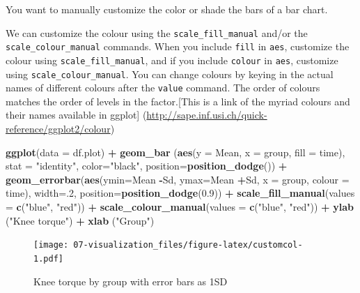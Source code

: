 \documentclass[
]{book}
\newenvironment{Shaded}{\begin{snugshade}}{\end{snugshade}}
\newcommand{\DataTypeTok}[1]{\textcolor[rgb]{0.13,0.29,0.53}{#1}}
\newcommand{\DecValTok}[1]{\textcolor[rgb]{0.00,0.00,0.81}{#1}}
\newcommand{\FloatTok}[1]{\textcolor[rgb]{0.00,0.00,0.81}{#1}}
\newcommand{\KeywordTok}[1]{\textcolor[rgb]{0.13,0.29,0.53}{\textbf{#1}}}
\newcommand{\NormalTok}[1]{#1}
\newcommand{\OperatorTok}[1]{\textcolor[rgb]{0.81,0.36,0.00}{\textbf{#1}}}
\newcommand{\StringTok}[1]{\textcolor[rgb]{0.31,0.60,0.02}{#1}}
\begin{document}
You want to manually customize the color or shade the bars of a bar chart.

We can customize the colour using the \texttt{scale\_fill\_manual} and/or the \texttt{scale\_colour\_manual} commands. When you include \texttt{fill} in \texttt{aes}, customize the colour using \texttt{scale\_fill\_manual}, and if you include \texttt{colour} in \texttt{aes}, customize using \texttt{scale\_colour\_manual}. You can change colours by keying in the actual names of different colours after the \texttt{value} command. The order of colours matches the order of levels in the factor.{[}This is a link of the myriad colours and their names available in ggplot{]} (\url{http://sape.inf.usi.ch/quick-reference/ggplot2/colour})

\begin{Shaded}
\begin{Highlighting}[]
\KeywordTok{ggplot}\NormalTok{(}\DataTypeTok{data =}\NormalTok{ df.plot) }\OperatorTok{+}\StringTok{ }
\KeywordTok{geom_bar}\NormalTok{ (}\KeywordTok{aes}\NormalTok{(}\DataTypeTok{y =}\NormalTok{ Mean, }\DataTypeTok{x =}\NormalTok{ group, }\DataTypeTok{fill =}\NormalTok{ time), }\DataTypeTok{stat =} \StringTok{"identity"}\NormalTok{, }\DataTypeTok{color=}\StringTok{"black"}\NormalTok{, }\DataTypeTok{position=}\KeywordTok{position_dodge}\NormalTok{()) }\OperatorTok{+}
\KeywordTok{geom_errorbar}\NormalTok{(}\KeywordTok{aes}\NormalTok{(}\DataTypeTok{ymin=}\NormalTok{Mean }\OperatorTok{-}\NormalTok{Sd, }\DataTypeTok{ymax=}\NormalTok{Mean }\OperatorTok{+}\NormalTok{Sd, }\DataTypeTok{x =}\NormalTok{ group, }\DataTypeTok{colour =}\NormalTok{ time), }
              \DataTypeTok{width=}\NormalTok{.}\DecValTok{2}\NormalTok{,}
               \DataTypeTok{position=}\KeywordTok{position_dodge}\NormalTok{(}\FloatTok{0.9}\NormalTok{)) }\OperatorTok{+}
\KeywordTok{scale_fill_manual}\NormalTok{(}\DataTypeTok{values =} \KeywordTok{c}\NormalTok{(}\StringTok{"blue"}\NormalTok{, }\StringTok{"red"}\NormalTok{)) }\OperatorTok{+}
\KeywordTok{scale_colour_manual}\NormalTok{(}\DataTypeTok{values =} \KeywordTok{c}\NormalTok{(}\StringTok{"blue"}\NormalTok{, }\StringTok{"red"}\NormalTok{)) }\OperatorTok{+}
\KeywordTok{ylab}\NormalTok{ (}\StringTok{"Knee torque"}\NormalTok{) }\OperatorTok{+}
\KeywordTok{xlab}\NormalTok{ (}\StringTok{"Group"}\NormalTok{)}
\end{Highlighting}
\end{Shaded}

\begin{figure}
\centering
\texttt{[image: 07-visualization\_files/figure-latex/customcol-1.pdf]}
\caption{\label{fig:customcol}Knee torque by group with error bars as 1SD}
\end{figure}
\end{document}
